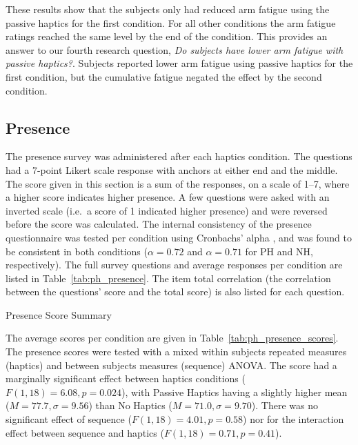 These results show that the subjects only had reduced arm fatigue using the passive haptics for the first condition.
For all other conditions the arm fatigue ratings reached the same level by the end of the condition.
This provides an answer to our fourth research question, \textit{Do subjects have lower arm fatigue with passive haptics?}.
Subjects reported lower arm fatigue using passive haptics for the first condition, but the cumulative fatigue negated the effect by the second condition.

\subsection{Presence}

The presence survey was administered after each haptics condition.
The questions had a 7-point Likert scale response with anchors at either end and the middle.
The score given in this section is a sum of the responses, on a scale of \numrange{1}{7}, where a higher score indicates higher presence.
A few questions were asked with an inverted scale (i.e.\ a score of 1 indicated higher presence) and were reversed before the score was calculated.
The internal consistency of the presence questionnaire was tested per condition using Cronbachs' alpha \citep{cronbach_coefficient_1951}, and was found to be consistent in both conditions ($\alpha=0.72$ and $\alpha=0.71$ for PH and NH, respectively).
The full survey questions and average responses per condition are listed in Table~\ref{tab:ph_presence}.
The item total correlation (the correlation between the questions' score and the total score) is also listed for each question.

\begin{table}
    \centering
    \small
    \caption{Presence Score Summary}
    \label{tab:ph_presence_scores}
\end{table}

The average scores per condition are given in Table~\ref{tab:ph_presence_scores}.
The presence scores were tested with a mixed within subjects repeated measures (haptics) and between subjects measures (sequence) ANOVA.
The score had a marginally significant effect between haptics conditions ($F(1,18)=6.08, p=0.024$), with Passive Haptics having a slightly higher mean ($M=77.7, \sigma=9.56$) than No Haptics ($M=71.0, \sigma=9.70$).
There was no significant effect of sequence ($F(1,18)=4.01, p=0.58$) nor for the interaction effect between sequence and haptics ($F(1,18)=0.71, p=0.41$).

